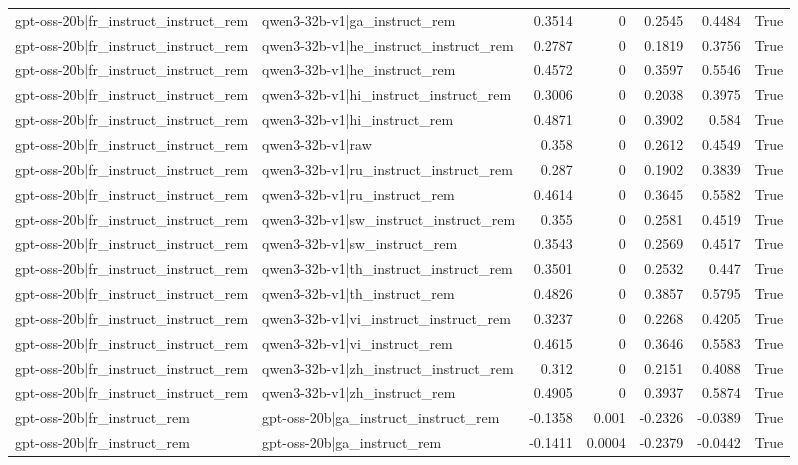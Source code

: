 \begin{table}
\begin{tabular}{l l r r r r l}
gpt-oss-20b|fr_instruct_instruct_rem & qwen3-32b-v1|ga_instruct_rem & 0.3514 & 0 & 0.2545 & 0.4484 & True \\
gpt-oss-20b|fr_instruct_instruct_rem & qwen3-32b-v1|he_instruct_instruct_rem & 0.2787 & 0 & 0.1819 & 0.3756 & True \\
gpt-oss-20b|fr_instruct_instruct_rem & qwen3-32b-v1|he_instruct_rem & 0.4572 & 0 & 0.3597 & 0.5546 & True \\
gpt-oss-20b|fr_instruct_instruct_rem & qwen3-32b-v1|hi_instruct_instruct_rem & 0.3006 & 0 & 0.2038 & 0.3975 & True \\
gpt-oss-20b|fr_instruct_instruct_rem & qwen3-32b-v1|hi_instruct_rem & 0.4871 & 0 & 0.3902 & 0.584 & True \\
gpt-oss-20b|fr_instruct_instruct_rem & qwen3-32b-v1|raw & 0.358 & 0 & 0.2612 & 0.4549 & True \\
gpt-oss-20b|fr_instruct_instruct_rem & qwen3-32b-v1|ru_instruct_instruct_rem & 0.287 & 0 & 0.1902 & 0.3839 & True \\
gpt-oss-20b|fr_instruct_instruct_rem & qwen3-32b-v1|ru_instruct_rem & 0.4614 & 0 & 0.3645 & 0.5582 & True \\
gpt-oss-20b|fr_instruct_instruct_rem & qwen3-32b-v1|sw_instruct_instruct_rem & 0.355 & 0 & 0.2581 & 0.4519 & True \\
gpt-oss-20b|fr_instruct_instruct_rem & qwen3-32b-v1|sw_instruct_rem & 0.3543 & 0 & 0.2569 & 0.4517 & True \\
gpt-oss-20b|fr_instruct_instruct_rem & qwen3-32b-v1|th_instruct_instruct_rem & 0.3501 & 0 & 0.2532 & 0.447 & True \\
gpt-oss-20b|fr_instruct_instruct_rem & qwen3-32b-v1|th_instruct_rem & 0.4826 & 0 & 0.3857 & 0.5795 & True \\
gpt-oss-20b|fr_instruct_instruct_rem & qwen3-32b-v1|vi_instruct_instruct_rem & 0.3237 & 0 & 0.2268 & 0.4205 & True \\
gpt-oss-20b|fr_instruct_instruct_rem & qwen3-32b-v1|vi_instruct_rem & 0.4615 & 0 & 0.3646 & 0.5583 & True \\
gpt-oss-20b|fr_instruct_instruct_rem & qwen3-32b-v1|zh_instruct_instruct_rem & 0.312 & 0 & 0.2151 & 0.4088 & True \\
gpt-oss-20b|fr_instruct_instruct_rem & qwen3-32b-v1|zh_instruct_rem & 0.4905 & 0 & 0.3937 & 0.5874 & True \\
gpt-oss-20b|fr_instruct_rem & gpt-oss-20b|ga_instruct_instruct_rem & -0.1358 & 0.001 & -0.2326 & -0.0389 & True \\
gpt-oss-20b|fr_instruct_rem & gpt-oss-20b|ga_instruct_rem & -0.1411 & 0.0004 & -0.2379 & -0.0442 & True \\

\end{tabular}
\end{table}
